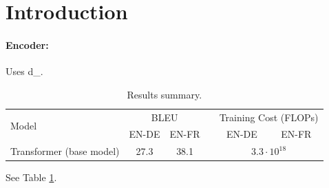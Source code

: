 \documentclass{article}
\begin{document}
\begin{abstract}
Compact smoke fixture for transformer-style conversion.
\end{abstract}

\newcommand{\dmodel}{d_{}}

\section{Introduction}
\paragraph{Encoder:} Uses \dmodel.

\begin{table}
\caption{Results summary.}
\label{tab:results}
\begin{tabular}{lccccc}
\toprule
\multirow{2}{*}{\vspace{-2mm}Model} & \multicolumn{2}{c}{BLEU} & & \multicolumn{2}{c}{Training Cost (FLOPs)} \\
& EN-DE & EN-FR & & EN-DE & EN-FR \\
\hline
Transformer (base model) & 27.3 & 38.1 & & \multicolumn{2}{c}{\boldmath$3.3\cdot10^{18}$}\\
\end{tabular}
\end{table}

See Table \ref{tab:results}.
\end{document}
